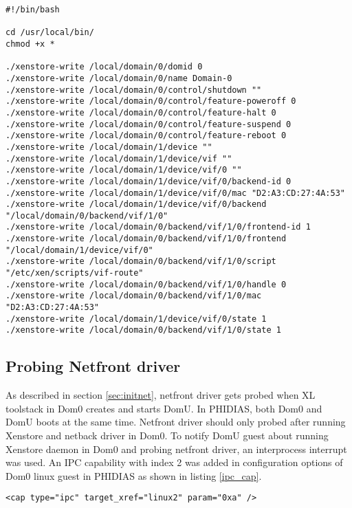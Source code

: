 \begin{lstlisting}[caption= Script used in Dom0 to write necessary keys for network drivers to Xenstore on PHIDIAS ,label={script_startup}]
#!/bin/bash

cd /usr/local/bin/
chmod +x *

./xenstore-write /local/domain/0/domid 0
./xenstore-write /local/domain/0/name Domain-0
./xenstore-write /local/domain/0/control/shutdown ""
./xenstore-write /local/domain/0/control/feature-poweroff 0
./xenstore-write /local/domain/0/control/feature-halt 0
./xenstore-write /local/domain/0/control/feature-suspend 0
./xenstore-write /local/domain/0/control/feature-reboot 0
./xenstore-write /local/domain/1/device ""
./xenstore-write /local/domain/1/device/vif ""
./xenstore-write /local/domain/1/device/vif/0 ""
./xenstore-write /local/domain/1/device/vif/0/backend-id 0
./xenstore-write /local/domain/1/device/vif/0/mac "D2:A3:CD:27:4A:53"
./xenstore-write /local/domain/1/device/vif/0/backend "/local/domain/0/backend/vif/1/0"
./xenstore-write /local/domain/0/backend/vif/1/0/frontend-id 1
./xenstore-write /local/domain/0/backend/vif/1/0/frontend "/local/domain/1/device/vif/0"
./xenstore-write /local/domain/0/backend/vif/1/0/script "/etc/xen/scripts/vif-route"
./xenstore-write /local/domain/0/backend/vif/1/0/handle 0
./xenstore-write /local/domain/0/backend/vif/1/0/mac "D2:A3:CD:27:4A:53"
./xenstore-write /local/domain/1/device/vif/0/state 1
./xenstore-write /local/domain/0/backend/vif/1/0/state 1

\end{lstlisting}

\subsection{Probing Netfront driver \label{sec:probenetfront}}
As described in section \ref{sec:initnet}, netfront driver gets probed when XL toolstack in Dom0 creates and starts DomU. In PHIDIAS, both Dom0 and DomU boots at the same time. Netfront driver should only probed after running Xenstore and netback driver in Dom0. To notify DomU guest about running Xenstore daemon in Dom0 and probing netfront driver, an interprocess interrupt was used. An IPC capability with index 2 was added in configuration options of Dom0 linux guest in PHIDIAS as shown in listing \ref{ipc_cap}.

\begin{lstlisting}[caption= Capability added in config options of Dom0 linux guest to notify DomU guest to probe netfront driver ,label={ipc_cap}]
    <cap type="ipc" target_xref="linux2" param="0xa" /> 
\end{lstlisting}

